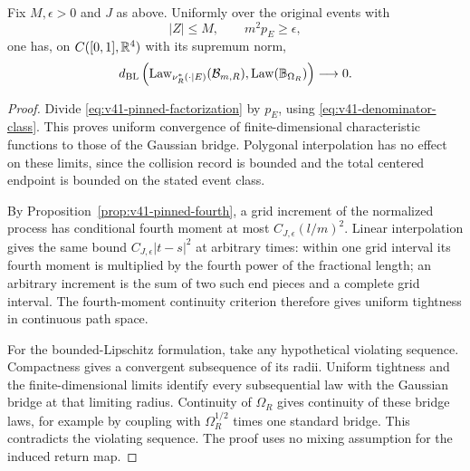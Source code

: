 \begin{theorem}
\label{thm:v41-collision-conditional-bridge}
Fix $M,\epsilon>0$ and $J$ as above. Uniformly over the original events
with
\begin{equation}\label{eq:v41-denominator-class}
 |Z|\le M,\qquad m^2p_E\ge\epsilon,
\end{equation}
one has, on $C([0,1],\mathbb R^4)$ with its supremum norm,
\begin{equation}\label{eq:v41-collision-conditional-bridge}
 d_{\rm BL}\left(\operatorname{Law}_{\nu_R^*(\cdot\mid E)}
                        (\mathcal B_{m,R}),
                         \operatorname{Law}(\mathbb B_{\Omega_R})\right)
                        \longrightarrow0.
\end{equation}
\end{theorem}
\begin{proof}
Divide \eqref{eq:v41-pinned-factorization} by $p_E$, using
\eqref{eq:v41-denominator-class}. This proves uniform convergence of
finite-dimensional characteristic functions to those of the Gaussian
bridge. Polygonal interpolation has no effect on these limits, since
the collision record is bounded and the total centered endpoint is
bounded on the stated event class.

By Proposition~\ref{prop:v41-pinned-fourth}, a grid increment of the
normalized process has conditional fourth moment at most
$C_{J,\epsilon}(l/m)^2$. Linear interpolation gives the same bound
$C_{J,\epsilon}|t-s|^2$ at arbitrary times: within one grid interval
its fourth moment is multiplied by the fourth power of the fractional
length; an arbitrary increment is the sum of two such end pieces
and a complete grid interval. The fourth-moment continuity criterion
therefore gives uniform tightness in continuous path space.

For the bounded-Lipschitz formulation, take any hypothetical violating
sequence. Compactness gives a convergent subsequence of its radii.
Uniform tightness and the finite-dimensional limits identify every
subsequential law with the Gaussian bridge at that limiting radius.
Continuity of $\Omega_R$ gives continuity of these bridge laws, for
example by coupling with $\Omega_R^{1/2}$ times one standard bridge.
This contradicts the violating sequence. The proof uses no mixing
assumption for the induced return map.
\end{proof}


